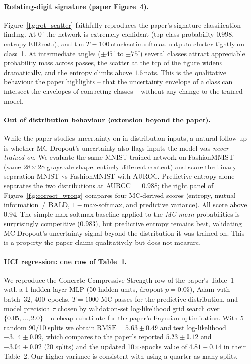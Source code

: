 \documentclass{article}
\begin{document}
\paragraph{Rotating-digit signature (paper Figure~4).} Figure~\ref{fig:rot_scatter} faithfully reproduces the paper's signature classification finding. At $0^\circ$ the network is extremely confident (top-class probability $0.998$, entropy $0.02$\,nats), and the $T=100$ stochastic softmax outputs cluster tightly on class~1. At intermediate angles ($\pm 45^\circ$ to $\pm 75^\circ$) several classes attract appreciable probability mass across passes, the scatter at the top of the figure widens dramatically, and the entropy climbs above $1.5$\,nats. This is the qualitative behaviour the paper highlights -- that the uncertainty envelope of a class can intersect the envelopes of competing classes -- without any change to the trained model.

\paragraph{Out-of-distribution behaviour (extension beyond the paper).} While the paper studies uncertainty on in-distribution inputs, a natural follow-up is whether MC Dropout's uncertainty also flags inputs the model was \emph{never trained on}. We evaluate the same MNIST-trained network on FashionMNIST (same $28\times28$ grayscale shape, entirely different content) and score the binary separation MNIST-vs-FashionMNIST with AUROC. Predictive entropy alone separates the two distributions at AUROC $=0.988$; the right panel of Figure~\ref{fig:correct_wrong} compares four MC-derived scores (entropy, mutual information~/~BALD, $1-$max-softmax, and predictive variance). All score above $0.94$. The simple max-softmax baseline applied to the \emph{MC mean} probabilities is surprisingly competitive ($0.983$), but predictive entropy remains best, validating MC Dropout's uncertainty signal beyond the distribution it was trained on. This is a property the paper claims qualitatively but does not measure.

\paragraph{UCI regression: one row of Table~1.} We reproduce the Concrete Compressive Strength row of the paper's Table~1 with a 1-hidden-layer MLP (50 hidden units, dropout $p\!=\!0.05$), Adam with batch~32, 400~epochs, $T\!=\!1000$ MC passes for the predictive distribution, and model precision $\tau$ chosen by validation-set log-likelihood grid search over $\{0.05,\dots,2.0\}$ -- a cheap substitute for the paper's Bayesian optimisation. With 5 random 90/10 splits we obtain $\mathrm{RMSE}=5.63\pm 0.49$ and test log-likelihood $-3.14\pm 0.09$, which compares to the paper's reported $5.23\pm 0.12$ and $-3.04\pm 0.02$ (20 splits) and the updated 10$\times$-epochs value of $4.81\pm 0.14$ in their Table~2. Our higher variance is consistent with using a quarter as many splits.
\end{document}
